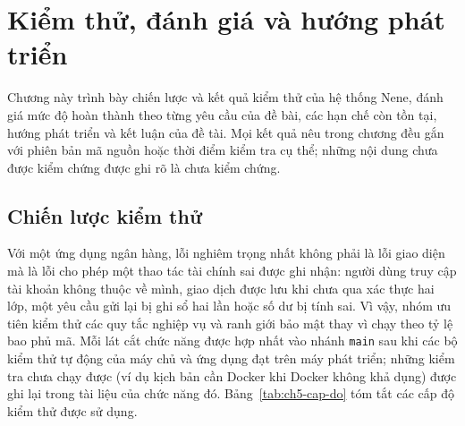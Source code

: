 \chapter{Kiểm thử, đánh giá và hướng phát triển}
\label{chap:5}

Chương này trình bày chiến lược và kết quả kiểm thử của hệ thống Nene, đánh giá mức độ hoàn thành theo từng yêu cầu của đề bài, các hạn chế còn tồn tại, hướng phát triển và kết luận của đề tài. Mọi kết quả nêu trong chương đều gắn với phiên bản mã nguồn hoặc thời điểm kiểm tra cụ thể; những nội dung chưa được kiểm chứng được ghi rõ là chưa kiểm chứng.

\section{Chiến lược kiểm thử}
\label{sec:ch5-chien-luoc}

Với một ứng dụng ngân hàng, lỗi nghiêm trọng nhất không phải là lỗi giao diện mà là lỗi cho phép một thao tác tài chính sai được ghi nhận: người dùng truy cập tài khoản không thuộc về mình, giao dịch được lưu khi chưa qua xác thực hai lớp, một yêu cầu gửi lại bị ghi sổ hai lần hoặc số dư bị tính sai. Vì vậy, nhóm ưu tiên kiểm thử các quy tắc nghiệp vụ và ranh giới bảo mật thay vì chạy theo tỷ lệ bao phủ mã. Mỗi lát cắt chức năng được hợp nhất vào nhánh \texttt{main} sau khi các bộ kiểm thử tự động của máy chủ và ứng dụng đạt trên máy phát triển; những kiểm tra chưa chạy được (ví dụ kịch bản cần Docker khi Docker không khả dụng) được ghi lại trong tài liệu của chức năng đó. Bảng~\ref{tab:ch5-cap-do} tóm tắt các cấp độ kiểm thử được sử dụng.


